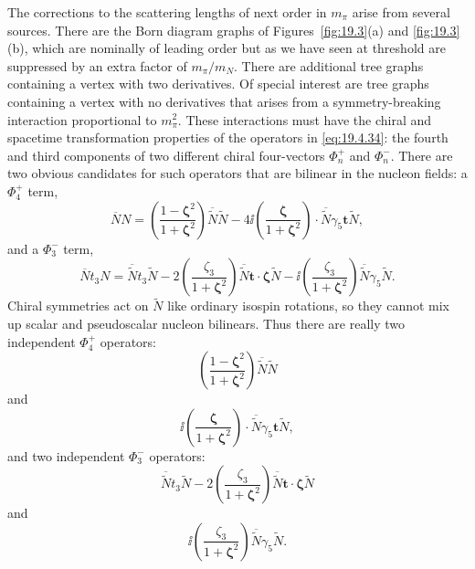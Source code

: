 The corrections to the scattering lengths of next order in $m_\pi$ arise from several sources. There are the Born diagram graphs of Figures~\ref{fig:19.3}(a) and \ref{fig:19.3}(b), which are nominally of leading order but as we have seen at threshold are suppressed by an extra factor of $m_\pi/m_N$. There are additional tree graphs containing a vertex with two derivatives. Of special interest are tree graphs containing a vertex with no derivatives that arises from a symmetry-breaking interaction proportional to $m_\pi^2$. These interactions must have the chiral and spacetime transformation properties of the operators in \eqref{eq:19.4.34}: the fourth and third components of two different chiral four-vectors $\Phi_n^+$ and $\Phi_n^-$. There are two obvious candidates for such operators that are bilinear in the nucleon fields: a $\Phi_4^+$ term,
\[
\overline NN
=\left(\frac{1-\boldsymbol{\zeta}^2}
{1+\boldsymbol{\zeta}^2}\right)
\overline{\widetilde N}\widetilde N
-4\ii\left(\frac{\boldsymbol{\zeta}}
{1+\boldsymbol{\zeta}^2}\right)
\cdot\overline{\widetilde N}\gamma_5\boldsymbol t\widetilde N,
\]
and a $\Phi_3^-$ term,
\[
\overline Nt_3N
=\overline{\widetilde N}t_3\widetilde N
-2\left(\frac{\zeta_3}{1+\boldsymbol{\zeta}^2}\right)
\overline{\widetilde N}\boldsymbol t\cdot
\boldsymbol{\zeta}\widetilde N
-\ii\left(\frac{\zeta_3}{1+\boldsymbol{\zeta}^2}\right)
\overline{\widetilde N}\gamma_5\widetilde N.
\]
Chiral symmetries act on $\widetilde N$ like ordinary isospin rotations, so they cannot mix up scalar and pseudoscalar nucleon bilinears. Thus there are really two independent $\Phi_4^+$ operators:
\begin{equation}
\left(\frac{1-\boldsymbol{\zeta}^2}
{1+\boldsymbol{\zeta}^2}\right)
\overline{\widetilde N}\widetilde N
\tag{19.5.61}\label{eq:19.5.61}
\end{equation}
and
\begin{equation}
\ii\left(\frac{\boldsymbol{\zeta}}
{1+\boldsymbol{\zeta}^2}\right)
\cdot\overline{\widetilde N}\gamma_5\boldsymbol t\widetilde N,
\tag{19.5.62}\label{eq:19.5.62}
\end{equation}
and two independent $\Phi_3^-$ operators:
\begin{equation}
\overline{\widetilde N}t_3\widetilde N
-2\left(\frac{\zeta_3}{1+\boldsymbol{\zeta}^2}\right)
\overline{\widetilde N}\boldsymbol t\cdot
\boldsymbol{\zeta}\widetilde N
\tag{19.5.63}\label{eq:19.5.63}
\end{equation}
and
\begin{equation}
\ii\left(\frac{\zeta_3}{1+\boldsymbol{\zeta}^2}\right)
\overline{\widetilde N}\gamma_5\widetilde N.
\tag{19.5.64}\label{eq:19.5.64}
\end{equation}
